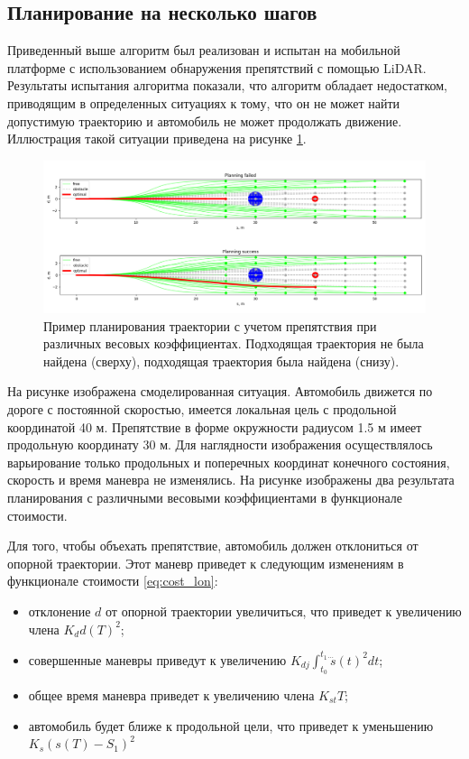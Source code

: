 \subsection{Планирование на несколько шагов}

Приведенный выше алгоритм был реализован и испытан на мобильной платформе с использованием обнаружения препятствий с
помощью LiDAR. Результаты испытания алгоритма показали, что алгоритм обладает недостатком, приводящим в определенных
ситуациях к тому, что он не может найти допустимую траекторию и автомобиль не может продолжать движение. Иллюстрация
такой ситуации приведена на рисунке \ref{img:quintic_planning_failed}.

\begin{figure}[h]
      \centering
      \includegraphics[width=\linewidth]{images/quintic_planning_failed}
      \caption{Пример планирования траектории с учетом препятствия при различных весовых коэффициентах.
      Подходящая траектория не была найдена (сверху), подходящая траектория была найдена (снизу).}
      \label{img:quintic_planning_failed}
\end{figure}

На рисунке изображена смоделированная ситуация. Автомобиль движется по дороге с постоянной скоростью, имеется локальная
цель с продольной координатой 40 м. Препятствие в форме окружности радиусом 1.5 м имеет продольную координату 30 м.
Для наглядности изображения осуществлялось варьирование только продольных и поперечных координат конечного состояния,
скорость и время маневра не изменялись. На рисунке изображены два результата планирования с различными весовыми
коэффициентами в функционале стоимости.

Для того, чтобы объехать препятствие, автомобиль должен отклониться от опорной траектории. Этот маневр приведет
к следующим изменениям в функционале стоимости \ref{eq:cost_lon}:
\begin{itemize}
      \item отклонение $d$ от опорной траектории увеличиться, что приведет к увеличению члена $K_dd(T)^2$;
      \item совершенные маневры приведут к увеличению $K_{dj}\int_{t_0}^{t_1}{\dddot{s}(t)^2dt}$;
      \item общее время маневра приведет к увеличению члена $K_{st}T$;
      \item автомобиль будет ближе к продольной цели, что приведет к уменьшению $K_s(s(T)-S_1)^2$
\end{itemize}

